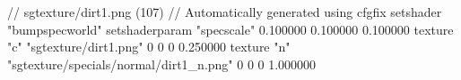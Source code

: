 // sgtexture/dirt1.png (107)
// Automatically generated using cfgfix
setshader "bumpspecworld"
setshaderparam "specscale" 0.100000 0.100000 0.100000
texture "c" "sgtexture/dirt1.png" 0 0 0 0.250000
texture "n" "sgtexture/specials/normal/dirt1_n.png" 0 0 0 1.000000
